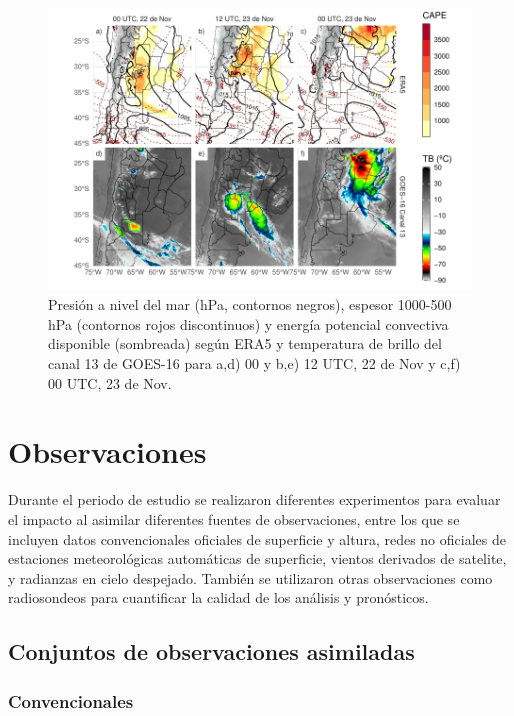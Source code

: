 \documentclass[12pt,oneside,a4paper]{reedthesis}
\begin{document}
\begin{figure}

{\centering \includegraphics{thesis_files/figure-latex/caso-1} 

}

\caption{Presión a nivel del mar (hPa, contornos negros), espesor 1000-500 hPa (contornos rojos discontinuos) y energía potencial convectiva disponible (sombreada) según ERA5 y temperatura de brillo del canal 13 de GOES-16 para a,d) 00 y b,e) 12 UTC, 22 de Nov y c,f) 00 UTC, 23 de Nov.~}\label{fig:caso}
\end{figure}
\hypertarget{observaciones}{%
\section{Observaciones}\label{observaciones}}

Durante el periodo de estudio se realizaron diferentes experimentos para evaluar el impacto al asimilar diferentes fuentes de observaciones, entre los que se incluyen datos convencionales oficiales de superficie y altura, redes no oficiales de estaciones meteorológicas automáticas de superficie, vientos derivados de satelite, y radianzas en cielo despejado. También se utilizaron otras observaciones como radiosondeos para cuantificar la calidad de los análisis y pronósticos.

\hypertarget{conjuntos-de-observaciones-asimiladas}{%
\subsection{Conjuntos de observaciones asimiladas}\label{conjuntos-de-observaciones-asimiladas}}

\hypertarget{convencionales}{%
\subsubsection{Convencionales}\label{convencionales}}
\end{document}
